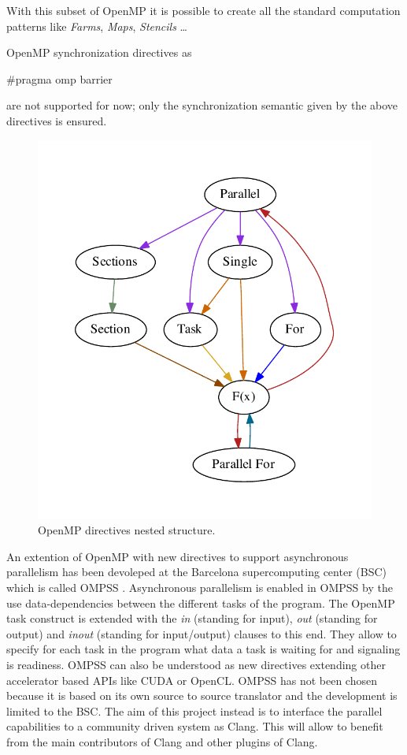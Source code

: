 \documentclass[a4paper,12pt,oneside]{book}
\begin{document}
With this subset of OpenMP it is possible to create all the standard computation patterns like \emph{Farms}, \emph{Maps}, \emph{Stencils} \dots 

OpenMP synchronization directives as \begin{bf}$\#$pragma omp barrier\end{bf} are not supported for now; only the synchronization semantic given by the above directives is ensured. 

\begin{figure}[H]
\centering
\includegraphics[scale=0.8]{omp.pdf}
\caption{OpenMP directives nested structure.}
\end{figure}

An extention of OpenMP with new directives to support asynchronous parallelism has been devoleped at the Barcelona supercomputing center (BSC) which is called OMPSS \cite{ompss}. Asynchronous parallelism is enabled in OMPSS by the use data-dependencies between the different tasks of the program. The OpenMP task construct is extended with the \emph{in} (standing for input), \emph{out} (standing for output) and \emph{inout} (standing for input/output) clauses to this end. They allow to specify for each task in the program what data a task is waiting for and signaling is readiness. OMPSS can also be understood as new directives extending other accelerator based APIs like CUDA or OpenCL. OMPSS has not been chosen because it is based on its own source to source translator and the development is limited to the BSC. The aim of this project instead is to interface the parallel capabilities to a community driven system as Clang. This will allow to benefit from the main contributors of Clang and other plugins of Clang.
\end{document}
